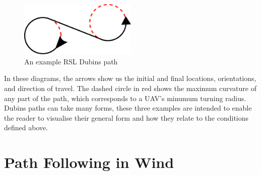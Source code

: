 \begin{figure}[htbp!] 
\centering    
\includegraphics[width=0.5\textwidth]{RSL}
\caption[Dubins RSL Path]{An example RSL Dubins path}
\label{fig:rsl}
\end{figure}

In these diagrams, the arrows show us the initial and final locations, orientations, and direction of travel. The dashed circle in red shows the maximum curvature of any part of the path, which corresponds to a UAV's minumum turning radius. Dubins paths can take many forms, these three examples are intended to enable the reader to visualise their general form and how they relate to the conditions defined above.



\section{Path Following in Wind}
\label{litrev:path}
